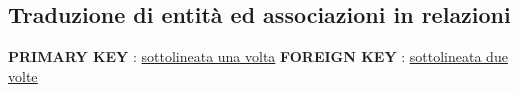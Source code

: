 




\newpage

\subsection{Traduzione di entità ed associazioni in relazioni}


\centering
\textsf{\small \textbf{PRIMARY KEY} : \underline{sottolineata una volta}}
\textsf{\small \textbf{FOREIGN KEY} : \underline{\underline{sottolineata due volte}}}\\


